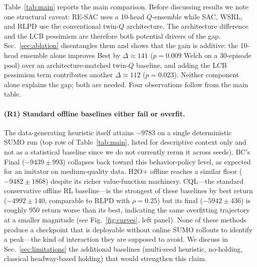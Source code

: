 \documentclass[journal,10pt]{IEEEtran}
\begin{document}
Table~\ref{tab:main} reports the main comparison. Before discussing results we note one structural caveat: RE-SAC uses a 10-head $Q$-ensemble while SAC, WSRL, and RLPD use the conventional twin-$Q$ architecture. The architecture difference and the LCB pessimism are therefore both potential drivers of the gap. Sec.~\ref{sec:ablation} disentangles them and shows that the gain is additive: the 10-head ensemble alone improves Best by $\Delta\!\approx\!141$ ($p\!=\!0.009$ Welch on a 30-episode pool) over an architecture-matched twin-$Q$ baseline, and adding the LCB pessimism term contributes another $\Delta\!\approx\!112$ ($p\!=\!0.023$). Neither component alone explains the gap; both are needed. Four observations follow from the main table.

\paragraph{(R1) Standard offline baselines either fail or overfit.} The data-generating heuristic itself attains $-9783$ on a single deterministic SUMO run (top row of Table~\ref{tab:main}, listed for descriptive context only and not as a statistical baseline since we do not currently rerun it across seeds). BC's Final ($-9439 \pm 993$) collapses back toward this behavior-policy level, as expected for an imitator on medium-quality data. H2O+ offline reaches a similar floor ($-9482 \pm 1868$) despite its richer value-function machinery. CQL---the standard conservative offline RL baseline---is the strongest of these baselines by best return ($-4992 \pm 140$, comparable to RLPD with $\rho=0.25$) but its final ($-5942 \pm 436$) is roughly 950 return worse than its best, indicating the same overfitting trajectory at a smaller magnitude (see Fig.~\ref{fig:curves}, left panel). None of these methods produce a checkpoint that is deployable without online SUMO rollouts to identify a peak---the kind of interaction they are supposed to avoid. We discuss in Sec.~\ref{sec:limitations} the additional baselines (multi-seed heuristic, no-holding, classical headway-based holding) that would strengthen this claim.
\end{document}
